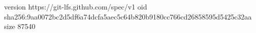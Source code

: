 version https://git-lfs.github.com/spec/v1
oid sha256:9aa0072bc2d5df6a74dcfa5aec5c64b820b9180cc766cd26858595d5425c32aa
size 87540
